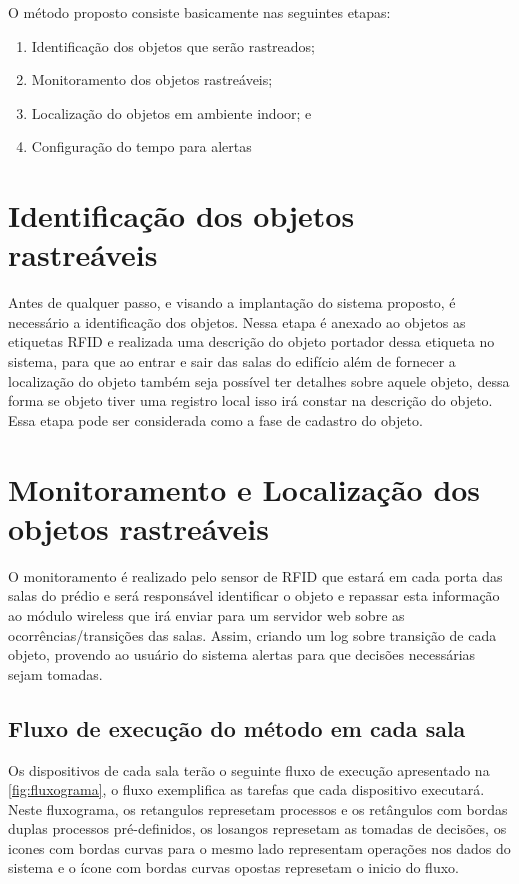 \par
O método proposto consiste basicamente nas seguintes etapas:
\begin{enumerate}
    \item Identificação dos objetos que serão rastreados;
    \item Monitoramento dos objetos rastreáveis;
    \item Localização do objetos em ambiente indoor; e
    \item Configuração do tempo para alertas
\end{enumerate}

%
%
\section{Identificação dos objetos rastreáveis}

Antes de qualquer passo, e visando a implantação do sistema proposto, é necessário a identificação dos objetos. 
Nessa etapa é anexado ao objetos as etiquetas RFID e realizada uma descrição do objeto portador dessa etiqueta 
no sistema, para que ao entrar e sair das salas do edifício além de fornecer a localização do objeto também seja 
possível ter detalhes sobre aquele objeto, dessa forma se objeto tiver uma registro local isso irá constar na 
descrição do objeto. Essa etapa pode ser considerada como a fase de cadastro do objeto.


\section{Monitoramento e Localização dos objetos rastreáveis}

O monitoramento é realizado pelo sensor de RFID que estará em cada porta das salas do prédio e será responsável 
identificar o objeto e repassar esta informação ao módulo wireless que irá enviar para um servidor web sobre as 
ocorrências/transições das salas. Assim, criando um log sobre transição de cada objeto, provendo ao usuário do sistema 
alertas para que decisões necessárias sejam tomadas.



\subsection{Fluxo de execução do método em cada sala}
Os dispositivos de cada sala terão o seguinte fluxo de execução apresentado na \autoref{fig:fluxograma}, 
o fluxo exemplifica as tarefas que cada dispositivo executará. Neste fluxograma, os retangulos represetam 
processos e os retângulos com bordas duplas processos pré-definidos, os losangos represetam as tomadas de decisões, 
os icones com bordas curvas para o mesmo lado representam operações nos dados do sistema e o ícone com bordas curvas 
opostas represetam o inicio do fluxo.

